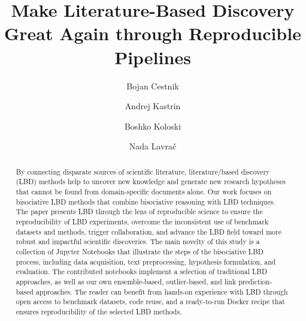 \documentclass[runningheads]{llncs}
\begin{document}
%
\title{Make Literature-Based Discovery \texorpdfstring{\\}{} Great Again through Reproducible Pipelines}
\author{Bojan Cestnik \and Andrej Kastrin \and Boshko Koloski \and Nada Lavra\v{c}
}
%
%
\maketitle
%
\begin{abstract}
By connecting disparate sources of scientific literature, literature\-/based discovery (LBD) methods help to uncover new knowledge and generate new research hypotheses that cannot be found from domain-specific documents alone. Our work focuses on bisociative LBD methods that combine bisociative reasoning with LBD techniques. The paper presents LBD through the lens of reproducible science to ensure the reproducibility of LBD experiments, overcome the inconsistent use of benchmark datasets and methods, trigger collaboration, and advance the LBD field toward more robust and impactful scientific discoveries. The main novelty of this study is a collection of Jupyter Notebooks that illustrate the steps of the bisociative LBD process, including data acquisition, text preprocessing, hypothesis formulation, and evaluation. The contributed notebooks implement a selection of traditional LBD approaches, as well as our own ensemble-based, outlier-based, and link prediction-based approaches. The reader can benefit from hands-on experience with LBD through open access to benchmark datasets, code reuse, and a ready-to-run Docker recipe that ensures reproducibility of the selected LBD methods. 

\end{abstract}
\end{document}
